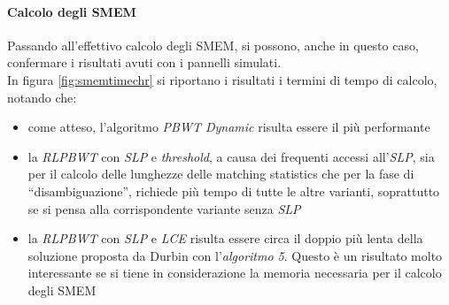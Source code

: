 \paragraph{Calcolo degli SMEM}
Passando all'effettivo calcolo degli SMEM, si possono, anche in questo caso,
confermare i risultati avuti con i pannelli simulati.\\
In figura \ref{fig:smemtimechr} si riportano i risultati i termini di tempo di
calcolo, notando che:
\begin{itemize}
  \item come atteso, l'algoritmo \textit{PBWT Dynamic} risulta essere il più
  performante
  \item la \textit{RLPBWT} con \textit{SLP} e \textit{threshold}, a causa dei
  frequenti accessi all'\textit{SLP}, sia per il calcolo delle lunghezze delle
  matching statistics che per la fase di ``disambiguazione'', richiede più tempo
  di tutte le altre varianti, soprattutto se si pensa alla corrispondente
  variante senza \textit{SLP}
  \item  la \textit{RLPBWT} con \textit{SLP} e \textit{LCE} risulta essere circa
  il doppio più lenta della soluzione proposta da Durbin con l'\textit{algoritmo
    5}. Questo è un risultato 
  molto interessante se si tiene in considerazione la memoria necessaria per il
  calcolo degli SMEM
\end{itemize}
